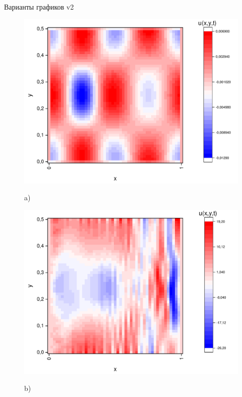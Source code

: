 \documentclass[a4paper,12pt]{article}
\begin{document}
Варианты графиков v2
\begin{figure}[h!]
	\begin{center}
		\begin{minipage}[h]{0.23\linewidth}
			\includegraphics[width=\textwidth]{graphs/graphs_a/v2/wave_t-0_v2.pdf} \begin{center}	a)	\end{center}
		\end{minipage}
		\begin{minipage}[h]{0.23\linewidth}
			\includegraphics[width=\textwidth]{graphs/graphs_a/v2/wave_t-6_v2.pdf} \begin{center}	b)	\end{center}

\end{minipage}
\end{center}
\end{figure}
\end{document}
